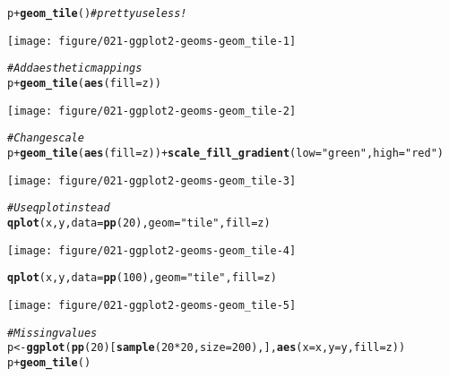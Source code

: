 \documentclass[a4paper,titlepage]{tufte-handout}\usepackage[]{graphicx}\usepackage[]{color}
\makeatletter
\def\maxwidth{ %
  \ifdim\Gin@nat@width>\linewidth
    \linewidth
  \else
    \Gin@nat@width
  \fi
}
\newcommand{\hlnum}[1]{\textcolor[rgb]{0.686,0.059,0.569}{#1}}%
\newcommand{\hlstr}[1]{\textcolor[rgb]{0.192,0.494,0.8}{#1}}%
\newcommand{\hlcom}[1]{\textcolor[rgb]{0.678,0.584,0.686}{\textit{#1}}}%
\newcommand{\hlopt}[1]{\textcolor[rgb]{0,0,0}{#1}}%
\newcommand{\hlstd}[1]{\textcolor[rgb]{0.345,0.345,0.345}{#1}}%
\newcommand{\hlkwb}[1]{\textcolor[rgb]{0.69,0.353,0.396}{#1}}%
\newcommand{\hlkwc}[1]{\textcolor[rgb]{0.333,0.667,0.333}{#1}}%
\newcommand{\hlkwd}[1]{\textcolor[rgb]{0.737,0.353,0.396}{\textbf{#1}}}%
\newenvironment{kframe}{%
 \def\at@end@of@kframe{}%
 \ifinner\ifhmode%
  \def\at@end@of@kframe{\end{minipage}}%
  \begin{minipage}{\columnwidth}%
 \fi\fi%
 \def\FrameCommand##1{\hskip\@totalleftmargin \hskip-\fboxsep
 \colorbox{shadecolor}{##1}\hskip-\fboxsep
     \hskip-\linewidth \hskip-\@totalleftmargin \hskip\columnwidth}%
 \MakeFramed {\advance\hsize-\width
   \@totalleftmargin\z@ \linewidth\hsize
   \@setminipage}}%
 {\par\unskip\endMakeFramed%
 \at@end@of@kframe}
\newenvironment{knitrout}{}{} %
\makeatother
\begin{document}
\begin{knitrout}
\begin{kframe}
\begin{alltt}
\hlstd{p} \hlopt{+} \hlkwd{geom_tile}\hlstd{()} \hlcom{#pretty useless!}
\end{alltt}
\end{kframe}
\texttt{[image: figure/021-ggplot2-geoms-geom\_tile-1]} 
\begin{kframe}\begin{alltt}
\hlcom{# Add aesthetic mappings}
\hlstd{p} \hlopt{+} \hlkwd{geom_tile}\hlstd{(}\hlkwd{aes}\hlstd{(}\hlkwc{fill}\hlstd{=z))}
\end{alltt}
\end{kframe}
\texttt{[image: figure/021-ggplot2-geoms-geom\_tile-2]} 
\begin{kframe}\begin{alltt}
\hlcom{# Change scale}
\hlstd{p} \hlopt{+} \hlkwd{geom_tile}\hlstd{(}\hlkwd{aes}\hlstd{(}\hlkwc{fill}\hlstd{=z))} \hlopt{+} \hlkwd{scale_fill_gradient}\hlstd{(}\hlkwc{low}\hlstd{=}\hlstr{"green"}\hlstd{,} \hlkwc{high}\hlstd{=}\hlstr{"red"}\hlstd{)}
\end{alltt}
\end{kframe}
\texttt{[image: figure/021-ggplot2-geoms-geom\_tile-3]} 
\begin{kframe}\begin{alltt}
\hlcom{# Use qplot instead}
\hlkwd{qplot}\hlstd{(x, y,} \hlkwc{data}\hlstd{=}\hlkwd{pp}\hlstd{(}\hlnum{20}\hlstd{),} \hlkwc{geom}\hlstd{=}\hlstr{"tile"}\hlstd{,} \hlkwc{fill}\hlstd{=z)}
\end{alltt}
\end{kframe}
\texttt{[image: figure/021-ggplot2-geoms-geom\_tile-4]} 
\begin{kframe}\begin{alltt}
\hlkwd{qplot}\hlstd{(x, y,} \hlkwc{data}\hlstd{=}\hlkwd{pp}\hlstd{(}\hlnum{100}\hlstd{),} \hlkwc{geom}\hlstd{=}\hlstr{"tile"}\hlstd{,} \hlkwc{fill}\hlstd{=z)}
\end{alltt}
\end{kframe}
\texttt{[image: figure/021-ggplot2-geoms-geom\_tile-5]} 
\begin{kframe}\begin{alltt}
\hlcom{# Missing values}
\hlstd{p} \hlkwb{<-} \hlkwd{ggplot}\hlstd{(}\hlkwd{pp}\hlstd{(}\hlnum{20}\hlstd{)[}\hlkwd{sample}\hlstd{(}\hlnum{20}\hlopt{*}\hlnum{20}\hlstd{,} \hlkwc{size}\hlstd{=}\hlnum{200}\hlstd{),],} \hlkwd{aes}\hlstd{(}\hlkwc{x}\hlstd{=x,}\hlkwc{y}\hlstd{=y,}\hlkwc{fill}\hlstd{=z))}
\hlstd{p} \hlopt{+} \hlkwd{geom_tile}\hlstd{()}
\end{alltt}

\end{kframe}
\end{knitrout}
\end{document}
